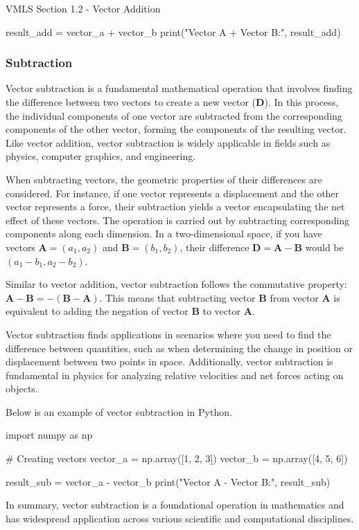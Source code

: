 \begin{notes}{VMLS Section 1.2 - Vector Addition}
\begin{highlight}
\begin{code}[Python]
    result_add = vector_a + vector_b
    print("Vector A + Vector B:", result_add)
    \end{code}
    \end{highlight}

    \subsubsection*{Subtraction}

    Vector subtraction is a fundamental mathematical operation that involves finding the difference between two vectors to create a new vector ($\mathbf{D}$). In this process, the individual components of one vector 
    are subtracted from the corresponding components of the other vector, forming the components of the resulting vector. Like vector addition, vector subtraction is widely applicable in fields such as physics, 
    computer graphics, and engineering.

    When subtracting vectors, the geometric properties of their differences are considered. For instance, if one vector represents a displacement and the other vector represents a force, their subtraction yields a 
    vector encapsulating the net effect of these vectors. The operation is carried out by subtracting corresponding components along each dimension. In a two-dimensional space, if you have vectors $\mathbf{A} = (a_1, a_2)$ 
    and $\mathbf{B} = (b_1, b_2)$, their difference $\mathbf{D} = \mathbf{A} - \mathbf{B}$ would be $(a_1 - b_1, a_2 - b_2)$.
    
    Similar to vector addition, vector subtraction follows the commutative property: $\mathbf{A} - \mathbf{B} = -(\mathbf{B} - \mathbf{A})$. This means that subtracting vector $\mathbf{B}$ from vector $\mathbf{A}$ is 
    equivalent to adding the negation of vector $\mathbf{B}$ to vector $\mathbf{A}$.

    Vector subtraction finds applications in scenarios where you need to find the difference between quantities, such as when determining the change in position or displacement between two points in space. Additionally, 
    vector subtraction is fundamental in physics for analyzing relative velocities and net forces acting on objects.

    \begin{highlight}
        Below is an example of vector subtraction in Python.

    \begin{code}[Python]
    import numpy as np

    # Creating vectors
    vector_a = np.array([1, 2, 3])
    vector_b = np.array([4, 5, 6])
    
    result_sub = vector_a - vector_b
    print("Vector A - Vector B:", result_sub)        
    \end{code}
    \end{highlight}

    In summary, vector subtraction is a foundational operation in mathematics and has widespread application across various scientific and computational disciplines.
\end{notes}

